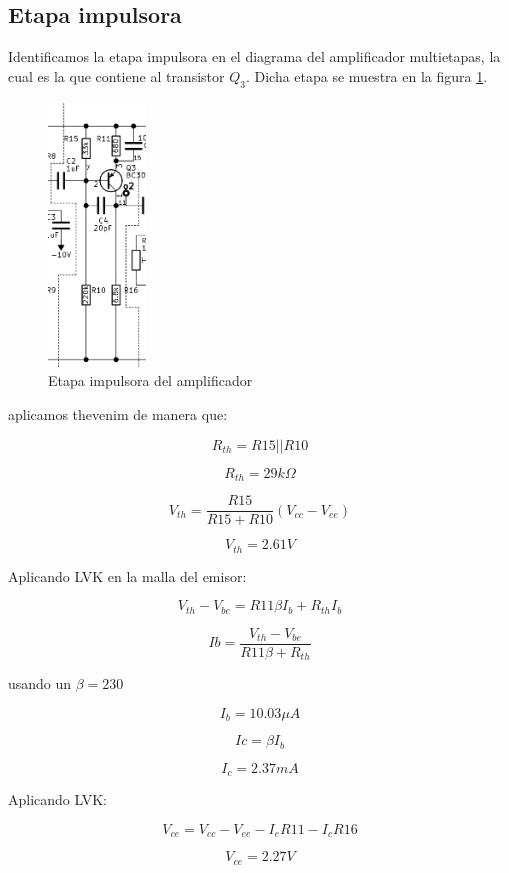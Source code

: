 \subsection{Etapa impulsora}

Identificamos la etapa impulsora en el diagrama del amplificador multietapas, la cual es la que contiene al  transistor $Q_3$. Dicha etapa se muestra en la figura \ref{fig:met-etapa-impulsora}.

\begin{figure}[ht]
    \centering
    \includegraphics[width=0.23\textwidth]{src/images/p3/etapa-impulsora.png}
    \caption{Etapa impulsora del amplificador}
    \label{fig:met-etapa-impulsora}
\end{figure}

aplicamos thevenim de manera que:

$$R_{th}= R15 || R10$$

$$R_{th}=29 k\Omega$$

$$V_{th} = \frac{R15}{R15 + R10} (V_{cc} - V_{ee})$$

$$V_{th} = 2.61 V $$

Aplicando LVK en la malla del emisor:

$$V_{th} - V_{be} = R11 \beta I_{b} + R_{th}I_b$$

$$ Ib = \frac{V_{th} - V_{be}}{R11\beta + R_{th}}$$

usando un $\beta = 230$

$$ I_b = 10.03 \mu A$$

$$Ic = \beta I_b$$

$$I_c = 2.37 mA$$

Aplicando LVK:

$$V_{ce} = V_{cc} - V_{ee} - I_eR11 - I_cR16$$

$$ V_{ce} = 2.27 V$$

